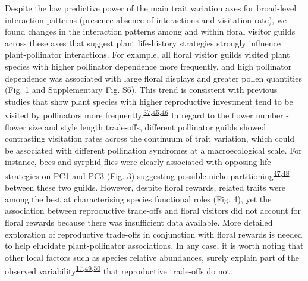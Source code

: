 \documentclass[
  12pt,
  a4paper,
]{article}
\begin{document}
Despite the low predictive power of the main trait variation axes for broad-level interaction patterns (presence-absence of interactions and visitation rate), we found changes in the interaction patterns among and within floral visitor guilds across these axes that suggest plant life-history strategies strongly influence plant-pollinator interactions. For example, all floral visitor guilds visited plant species with higher pollinator dependence more frequently, and high pollinator dependence was associated with large floral displays and greater pollen quantities (Fig. 1 and Supplementary Fig. S6). This trend is consistent with previous studies that show plant species with higher reproductive investment tend to be visited by pollinators more frequently.\textsuperscript{\protect\hyperlink{ref-lazaro2013}{37},\protect\hyperlink{ref-hegland2005}{45},\protect\hyperlink{ref-kaiser2014}{46}} In regard to the flower number - flower size and style length trade-offs, different pollinator guilds showed contrasting visitation rates across the continuum of trait variation, which could be associated with different pollination syndromes at a macroecological scale. For instance, bees and syrphid flies were clearly associated with opposing life-strategies on PC1 and PC3 (Fig. 3) suggesting possible niche partitioning\textsuperscript{\protect\hyperlink{ref-palmer2003}{47},\protect\hyperlink{ref-phillips2020}{48}} between these two guilds. However, despite floral rewards, related traits were among the best at characterising species functional roles (Fig. 4), yet the association between reproductive trade-offs and floral visitors did not account for floral rewards because there was insufficient data available. More detailed exploration of reproductive trade-offs in conjunction with floral rewards is needed to help elucidate plant-pollinator associations. In any case, it is worth noting that other local factors such as species relative abundances, surely explain part of the observed variability\textsuperscript{\protect\hyperlink{ref-bartomeus2016}{17},\protect\hyperlink{ref-vazquez2007}{49},\protect\hyperlink{ref-encinas2012}{50}} that reproductive trade-offs do not.
\end{document}
